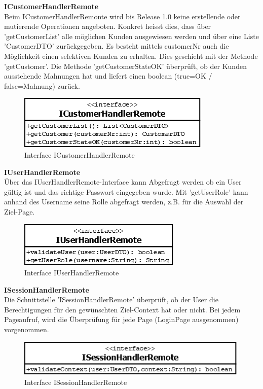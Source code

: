 \textbf{ICustomerHandlerRemote}\\
Beim ICustomerHandlerRemonte wird bis Release 1.0 keine erstellende oder mutierende Operationen angeboten. Konkret heisst dies, dass über 'getCustomerList' alle möglichen Kunden ausgewiesen werden und über eine Liste 'CustomerDTO' zurückgegeben. Es besteht mittels customerNr auch die Möglichkeit einen selektiven Kunden zu erhalten. Dies geschieht mit der Methode 'getCustomer'.
Die Methode 'getCustomerStateOK' überprüft, ob der Kunden ausstehende Mahnungen hat und liefert einen boolean (true=OK / false=Mahnung) zurück.
\begin{figure}[H]
	\includegraphics[width=0.4\linewidth]{Images/ICustomerHandlerRemote}
	\caption{Interface ICustomerHandlerRemote}
	\label{fig:if-ICustomerHandlerRemote}
\end{figure}

\textbf{IUserHandlerRemote}\\
Über das IUserHandlerRemote-Interface kann Abgefragt werden ob ein User gültig ist und das richtige Passwort eingegeben wurde. Mit 'getUserRole' kann anhand des Username seine Rolle abgefragt werden, z.B. für die Auswahl der Ziel-Page. 
\begin{figure}[H]
	\includegraphics[width=0.4\linewidth]{Images/IUserHandlerRemote}
	\caption{Interface IUserHandlerRemote}
	\label{fig:if-IUserHandlerRemote}
\end{figure}


\textbf{ISessionHandlerRemote}\\
Die Schnittstelle 'ISessionHandlerRemote' überprüft, ob der User die Berechtigungen für den gewünschten Ziel-Context hat oder nicht. Bei jedem Pageaufruf, wird die Überprüfung für jede Page (LoginPage ausgenommen) vorgenommen.
\begin{figure}[H]
	\includegraphics[width=0.5\linewidth]{Images/ISessionHandlerRemote}
	\caption{Interface ISessionHandlerRemote}
	\label{fig:if-ISessionHandlerRemote}
\end{figure}

